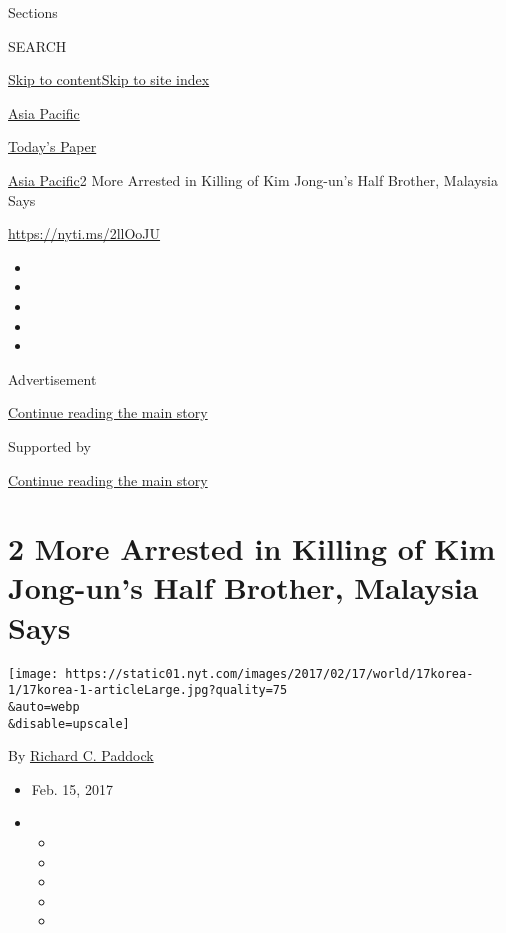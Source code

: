 Sections

SEARCH

\protect\hyperlink{site-content}{Skip to
content}\protect\hyperlink{site-index}{Skip to site index}

\href{https://www.nytimes.com/section/world/asia}{Asia Pacific}

\href{https://myaccount.nytimes.com/auth/login?response_type=cookie\&client_id=vi}{}

\href{https://www.nytimes.com/section/todayspaper}{Today's Paper}

\href{/section/world/asia}{Asia Pacific}\textbar{}2 More Arrested in
Killing of Kim Jong-un's Half Brother, Malaysia Says

\url{https://nyti.ms/2llOoJU}

\begin{itemize}
\item
\item
\item
\item
\item
\end{itemize}

Advertisement

\protect\hyperlink{after-top}{Continue reading the main story}

Supported by

\protect\hyperlink{after-sponsor}{Continue reading the main story}

\hypertarget{2-more-arrested-in-killing-of-kim-jong-uns-half-brother-malaysia-says}{%
\section{2 More Arrested in Killing of Kim Jong-un's Half Brother,
Malaysia
Says}\label{2-more-arrested-in-killing-of-kim-jong-uns-half-brother-malaysia-says}}

\texttt{[image: https://static01.nyt.com/images/2017/02/17/world/17korea-1/17korea-1-articleLarge.jpg?quality=75\\\&auto=webp\\\&disable=upscale]}

By \href{https://www.nytimes.com/by/richard-c-paddock}{Richard C.
Paddock}

\begin{itemize}
\item
  Feb. 15, 2017
\item
  \begin{itemize}
  \item
  \item
  \item
  \item
  \item
  \end{itemize}
\end{itemize}

